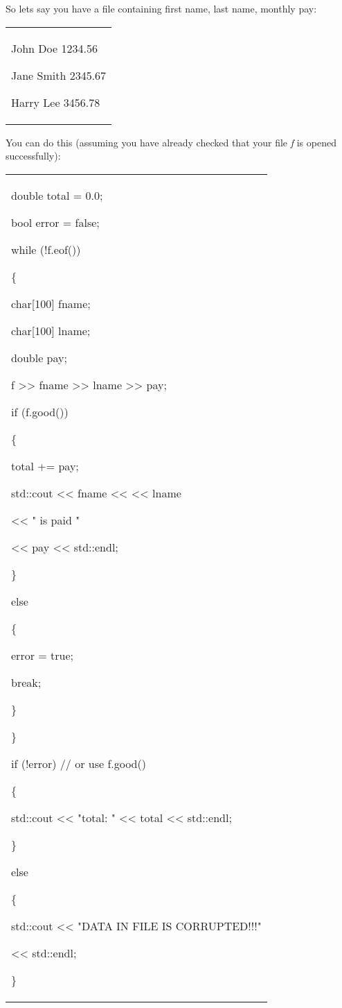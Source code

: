 \documentclass[
]{article}
\begin{document}
So let\textquotesingle s say you have a file containing first name, last
name, monthly pay:

\begin{longtable}[]{@{}
  >{\raggedright\arraybackslash}p{}@{}}
\toprule\noalign{}
 \\
\midrule\noalign{}
\endhead
\bottomrule\noalign{}
\endlastfoot
John Doe 1234.56

Jane Smith 2345.67

Harry Lee 3456.78 \\
\end{longtable}

You can do this (assuming you have already checked that your file
\emph{f} is opened successfully):

\begin{longtable}[]{@{}
  >{\raggedright\arraybackslash}p{}@{}}
\toprule\noalign{}
 \\
\midrule\noalign{}
\endhead
\bottomrule\noalign{}
\endlastfoot
double total = 0.0;

bool error = false;

while (!f.eof())

\{

char{[}100{]} fname;

char{[}100{]} lname;

double pay;

f \textgreater\textgreater{} fname \textgreater\textgreater{} lname
\textgreater\textgreater{} pay;

if (f.good())

\{

total += pay;

std::cout \textless\textless{} fname \textless\textless{}
\textquotesingle{} \textquotesingle{} \textless\textless{} lname

\textless\textless{} " is paid "

\textless\textless{} pay \textless\textless{} std::endl;

\}

else

\{

error = true;

break;

\}

\}

if (!error) // or use f.good()

\{

std::cout \textless\textless{} "total: " \textless\textless{} total
\textless\textless{} std::endl;

\}

else

\{

std::cout \textless\textless{} "DATA IN FILE IS CORRUPTED!!!"

\textless\textless{} std::endl;

\} \\
\end{longtable}
\end{document}
